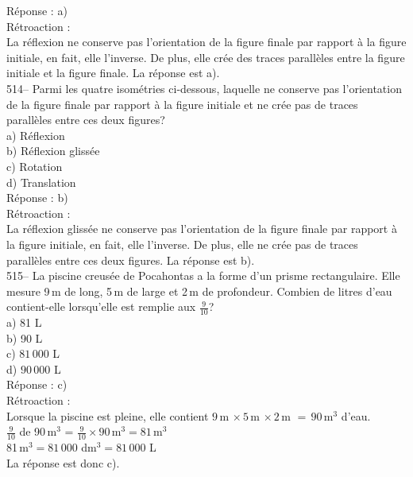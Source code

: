 ﻿\documentclass[letterpaper, 12pt]{article}
\begin{document}
R\'eponse : a)\\

R\'etroaction :\\
La r\'eflexion ne conserve pas l'orientation de la figure finale par rapport
\`a la figure initiale, en fait, elle l'inverse. De plus, elle cr\'ee des
traces parall\`eles entre la figure initiale et la figure finale.  La
r\'eponse est a).\\

514--  Parmi les quatre isom\'etries ci-dessous, laquelle ne conserve pas
l'orientation de la figure finale par rapport \`a la figure initiale et ne
cr\'ee pas de traces parall\`eles entre ces deux figures?\\
a) R\'eflexion\\
b) R\'eflexion gliss\'ee\\
c) Rotation\\
d) Translation\\

R\'eponse : b)\\

R\'etroaction :\\
La r\'eflexion gliss\'ee ne conserve pas l'orientation de la figure finale
par rapport \`a la figure initiale, en fait, elle l'inverse. De plus, elle
ne cr\'ee pas de traces parall\`eles entre ces deux figures.  La r\'eponse
est b).\\

515-- La piscine creus\'ee de Pocahontas a la forme d'un prisme
rectangulaire.  Elle mesure 9\,m de long, 5\,m de large et 2\,m de
profondeur.  Combien de litres d'eau contient-elle lorsqu'elle est remplie
aux $\frac{9}{10}$?\\
a) 81 L\\
b) 90 L\\
c) $81\,000$ L\\
d) $90\,000$ L\\

R\'eponse : c)\\

R\'etroaction :\\
Lorsque la piscine est pleine, elle contient $9$\,m
$\times\,5$\,m $\times\,2$\,m $=\,90$\,m$^{3}$ d'eau.\\[2mm]
$\frac{9}{10}$ de 90\,m$^{3}$ =
$\frac{9}{10}\times90$\,m$^{3}=81$\,m$^{3}$\\[2mm]
81\,m$^{3}=81\,000$ dm$^{3}=81\,000$ L\\[2mm]
La r\'eponse est donc c).\\
\end{document}
